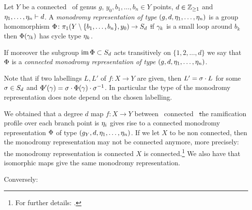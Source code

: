 \documentclass[../main/main.tex]{subfiles}
\begin{document}
\begin{definition}
	Let $Y$ be a connected \rs\ of genus $g$, $y_0,b_1,\ldots,b_n\in Y$ points, $d\in\mathbb Z_{\geq1}$ and $\eta_1,\ldots,\eta_n\vdash d$. A \emph{monodromy representation of type} $(g,d,\eta_1,\ldots,\eta_n)$ is a group homomorphism $\Phi\colon\pi_1(Y\setminus\{b_1,\ldots,b_n\},y_0)\to S_d$ \st if $\gamma_k$ is a small loop around $b_k$ then $\Phi(\gamma_k)$ has cycle type $\eta_k$.
	
	If moreover the subgroup $\operatorname{im} \Phi\subset S_d$ acts transitively on $\{1,2,\ldots,d\}$ we say that $\Phi$ is a \emph{connected monodromy representation of type} $(g,d,\eta_1,\ldots,\eta_n)$.
	
\end{definition}

Note that if two labellings $L,L'$ of $f\colon X\to Y$ are given, then $L'=\sigma\cdot L$ for some $\sigma\in S_d$ and $\Phi'(\gamma)=\sigma\cdot\Phi(\gamma)\cdot\sigma^{-1}$. In particular the type of the monodromy representation does note depend on the chosen labelling. 


We obtained that a degree $d$ map $f\colon X\to Y$ between \cpt\ connected \rss\ \st the ramification profile over each branch point is $\eta_i$ gives rise to a connected monodromy representation $\Phi$ of type $(g_Y,d,\eta_1,\ldots,\eta_n)$. If we let $X$ to be non connected, then the monodromy representation may not be connected anymore, more precisely: the monodromy representation is connected \tiff $X$ is connected.\footnote{For further details: \cite[§§7.1]{CM}.} We also have that isomorphic maps give the same monodromy representation. 

Conversely:
\end{document}
